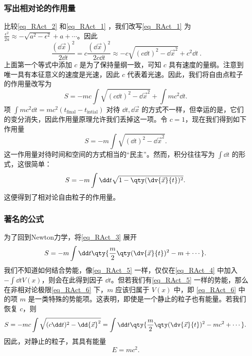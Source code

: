 \subsubsection{写出相对论的作用量}
比较\autoref{eq_RAct_2} 和\autoref{eq_RAct_1} ，我们改写\autoref{eq_RAct_1} 为
$
\frac{\epsilon^2}{2a}\approx-\sqrt{a^2-\epsilon^2}+ a+\cdots
$。因此
\begin{equation}
\frac{(\dd{\vec x})^2}{2\dd t}=c\frac{(\dd{\vec x})^2}{2c\dd t}\approx-c\sqrt{(c\dd t)^2-\dd{\vec x}^2}+c^2\dd t~.
\end{equation}
上面第一个等式中添加 $c$ 是为了保持量纲一致，可知 $c$ 具有速度的量纲。注意到唯一具有本征意义的速度是光速，因此 $c$ 代表着光速。因此，我们将自由点粒子的作用量改写为
\begin{equation}
S=-mc\int \sqrt{(c\dd t)^2-\dd{\vec x}^2}+\int mc^2\dd t.~
\end{equation}
项 $\int mc^2\dd t =m c^2(t_{\mathrm{final}}-t_{\mathrm{intial}})$ 对待 $\dd t,\dd{\vec x}$ 的方式不一样，但幸运的是，它们的变分消失，因此作用量原理允许我们丢掉这一项。令 $c=1$，现在我们得到如下作用量
\begin{equation}\label{eq_RAct_4}
S=-m\int \sqrt{(\dd t)^2-\dd{\vec x}^2}.~
\end{equation}
这一作用量对待时间和空间的方式相当的“民主”。然而，积分往往写为 $\int\dd t$ 的形式，这很简单：
\begin{equation}\label{eq_RAct_3}
S=-m\int\dd t \sqrt{1-\qty(\dv{\vec x}{t})^2}.~
\end{equation}
这便得到了相对论自由粒子的作用量。

\subsubsection{著名的公式}
为了回到Newton力学，将\autoref{eq_RAct_3} 展开
\begin{equation}\label{eq_RAct_6}
S=-m\int\dd t \qty{\frac{m}{2}\qty(\dv{\vec x}{t})^2-m+\cdots}.~
\end{equation}
我们不知道如何结合势能，像\autoref{eq_RAct_5} 一样，仅仅在\autoref{eq_RAct_4} 中加入 $-\int\dd t V(x)$，则会在此得到因子 $\dd t$。但若我们有\autoref{eq_RAct_5} 一样的势能，那么在非相对论极限\autoref{eq_RAct_6} 下，$m$ 应该归属于 $V(x)$ 中，即 \autoref{eq_RAct_6} 中的项 $m$ 是一类特殊的势能项。这表明，即使是一个静止的粒子也有能量。若我们恢复 $c$，则 
\begin{equation}
S=-mc\int \sqrt{(c\dd t)^2-\dd{\vec x}^2}=\int\dd t \qty{\frac{m}{2}\qty(\dv{\vec x}{t})^2-mc^2+\cdots}.~
\end{equation}
因此，对静止的粒子，其具有能量
\begin{equation}
E=mc^2.~
\end{equation}

